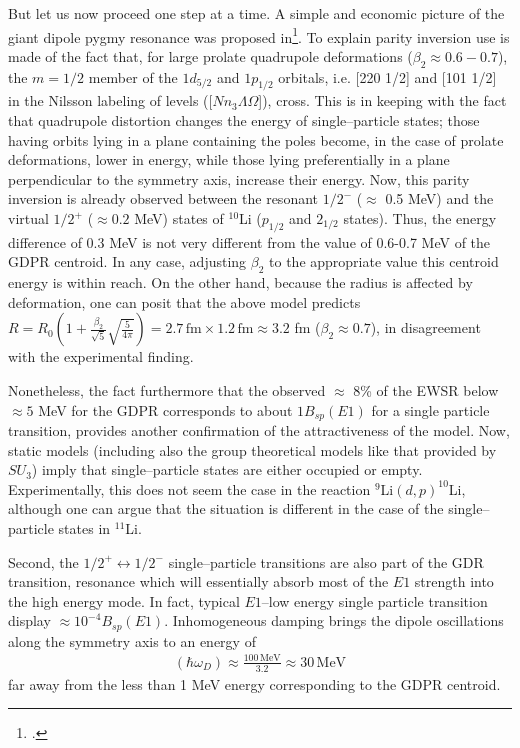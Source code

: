 \begin{subappendices}
But let us now proceed one step at a time. A  simple and economic picture of the giant dipole pygmy resonance was proposed in\footnote{\cite{Hamamoto:07}.}. To explain parity inversion use is made of the fact that, for large prolate quadrupole deformations ($\beta_2\approx0.6-0.7$), the $m=1/2$ member of the $1d_{5/2}$ and $1p_{1/2}$ orbitals, i.e. [220 1/2] and [101 1/2] in the Nilsson labeling of levels ([$Nn_3\Lambda\Omega$]), cross. This is in keeping with the fact that quadrupole distortion changes the energy of single--particle states; those having orbits lying in a plane containing the poles become, in the case of prolate deformations, lower in energy, while those lying preferentially in a plane perpendicular to the symmetry axis, increase their energy. Now, this parity inversion is already observed between the resonant $1/2^-$ ($\approx$ 0.5 MeV) and the virtual $1/2^+$ ($\approx 0.2$ MeV) states of $^{10}$Li ($p_{1/2}$ and $2_{1/2}$ states). Thus, the energy difference of 0.3 MeV is not very different from the value of 0.6-0.7 MeV of the GDPR centroid. In any case, adjusting $\beta_2$ to the appropriate value this centroid energy is within reach. On the other hand, because the radius is  affected by deformation, one can posit that the above model predicts  $R=R_0(1+\frac{\beta_2}{\sqrt{5}}\sqrt{\frac{5}{4\pi}})=2.7\,\text{fm}\times 1.2\,\text{fm}\approx 3.2$ fm ($\beta_2\approx0.7$), in disagreement  with the experimental finding. 


Nonetheless, the fact furthermore that the observed $\approx$ 8\% of the EWSR below $\approx 5$ MeV for the GDPR corresponds to about $1B_{sp}(E1)$ for a single particle transition, provides another confirmation of the attractiveness of the model. Now, static models (including also the group theoretical models like that provided by $SU_3$) imply that single--particle states are either occupied or empty. Experimentally, this does not seem the case in the reaction $^9$Li$(d,p)^{10}$Li, although one can argue that the situation is different in the case of the single--particle states in $^{11}$Li.


Second, the $1/2^+ \longleftrightarrow1/2^-$ single--particle transitions are also  part of the GDR transition, resonance which will essentially absorb most of the $E1$ strength into the high energy mode. In fact, typical $E1$--low energy single particle transition display $\approx 10^{-4}B_{sp}(E1)$. Inhomogeneous damping  brings the dipole oscillations along the symmetry axis to an energy of
\begin{align}
(\hbar\omega_D)\approx\frac{100\,\text{MeV}}{3.2}\approx 30\,\text{MeV}
\end{align}
far away from the less than 1 MeV energy corresponding to the GDPR centroid.


\end{subappendices}
